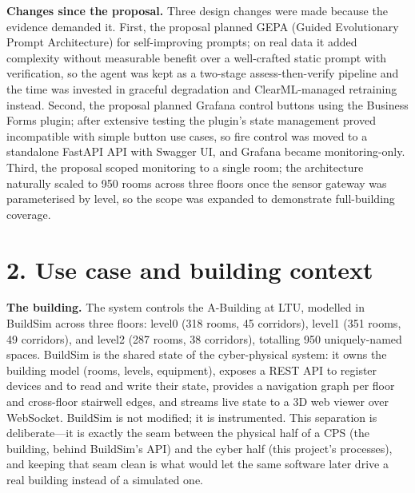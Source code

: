 \documentclass[11pt]{article}
\begin{document}
\textbf{Changes since the proposal.} Three design changes were made because the evidence demanded it. First, the proposal planned GEPA (Guided Evolutionary Prompt Architecture) for self-improving prompts; on real data it added complexity without measurable benefit over a well-crafted static prompt with verification, so the agent was kept as a two-stage assess-then-verify pipeline and the time was invested in graceful degradation and ClearML-managed retraining instead. Second, the proposal planned Grafana control buttons using the Business Forms plugin; after extensive testing the plugin's state management proved incompatible with simple button use cases, so fire control was moved to a standalone FastAPI API with Swagger UI, and Grafana became monitoring-only. Third, the proposal scoped monitoring to a single room; the architecture naturally scaled to 950 rooms across three floors once the sensor gateway was parameterised by level, so the scope was expanded to demonstrate full-building coverage.


\section{2. Use case and building context}

\textbf{The building.} The system controls the A-Building at LTU, modelled in BuildSim across three floors: level0 (318 rooms, 45 corridors), level1 (351 rooms, 49 corridors), and level2 (287 rooms, 38 corridors), totalling 950 uniquely-named spaces. BuildSim is the shared state of the cyber-physical system: it owns the building model (rooms, levels, equipment), exposes a REST API to register devices and to read and write their state, provides a navigation graph per floor and cross-floor stairwell edges, and streams live state to a 3D web viewer over WebSocket. BuildSim is not modified; it is instrumented. This separation is deliberate---it is exactly the seam between the physical half of a CPS (the building, behind BuildSim's API) and the cyber half (this project's processes), and keeping that seam clean is what would let the same software later drive a real building instead of a simulated one.
\end{document}
